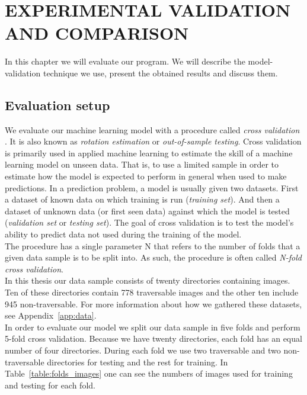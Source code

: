 \documentclass[12pt,a4paper,table,dvipsnames,tikz]{report}
\newcommand{\term}{\textit}
\newcommand{\bl}[1]{{\hypersetup{linkcolor=blue}#1}}
\begin{document}
	
	\chapter{EXPERIMENTAL VALIDATION AND COMPARISON}
	\label{sec:exp}
	
	In this chapter we will evaluate our program. We will describe the model-validation 
	technique we use, present the obtained results and discuss them.
	\\
	
	\section{Evaluation setup}
	\label{sec:exp:eval}
	
	We evaluate our machine learning model with a procedure called \term{cross validation} 
	\citep{Brownlee}. It is also known as \term{rotation estimation} or \term{out-of-sample 
	testing}. Cross validation is primarily used in applied machine learning to estimate 
	the skill of a machine learning model on unseen data. That is, to use a limited sample 
	in order to estimate how the model is expected to perform in general when used to make 
	predictions. In a prediction problem, a model is usually given two datasets. First a 
	dataset of known data on which training is run (\term{training set}). And then a dataset 
	of unknown data (or first seen data) against which the model is tested (\term{validation 
	set} or \term{testing set}). The goal of cross validation is to test the model's ability 
	to predict data not used during the training of the model.
	\\
	
	The procedure has a single parameter N that refers to the number of folds that a given 
	data sample is to be split into. As such, the procedure is often called \term{N-fold 
	cross validation}.
	\\
	
	In this thesis our data sample consists of twenty directories containing images. 
	Ten of these directories contain 778 traversable images and the other ten include 
	945 non-traversable. For more information about how we gathered these datasets, see 
	Appendix~\ref{app:data}.
	\\
	
	In order to evaluate our model we split our data sample in five folds and perform 
	5-fold cross validation. Because we have twenty directories, each fold has an equal 
	number of four directories. During each fold we use two traversable and two non-traversable 
	directories for testing and the rest for training. In Table~\bl{\ref{table:folds_images}} 
	one can see the numbers of images used for training and testing for each fold.
	\\
	
\end{document}
